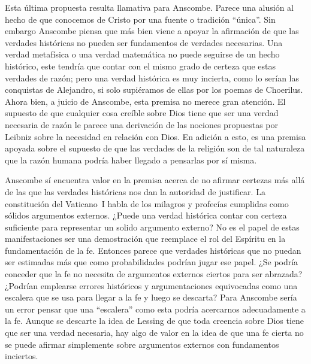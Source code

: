 Esta última propuesta resulta llamativa para Anscombe. Parece una alusión al
hecho de que conocemos de Cristo por una fuente o tradición \enquote{única}. Sin
embargo Anscombe piensa que más bien viene a apoyar la afirmación de que las
verdades históricas no pueden ser fundamentos de verdades necesarias. Una verdad
metafísica o una verdad matemática no puede seguirse de un hecho histórico, este
tendría que contar con el mismo grado de certeza que estas verdades de razón;
pero una verdad histórica es muy incierta, como lo serían las conquistas de
Alejandro, si solo supiéramos de ellas por los poemas de Choerilus. Ahora bien,
a juicio de Anscombe, esta premisa no merece gran atención. El supuesto de que
cualquier cosa creíble sobre Dios tiene que ser una verdad necesaria de razón le
parece una derivación de las nociones propuestas por Leibniz sobre la necesidad
en relación con Dios. En adición a esto, es una premisa apoyada sobre el
supuesto de que las verdades de la religión son de tal naturaleza que la razón
humana podría haber llegado a pensarlas por sí misma.

Anscombe sí encuentra valor en la premisa acerca de no afirmar certezas más allá
de las que las verdades históricas nos dan la autoridad de justificar. La
constitución del Vaticano~I habla de los milagros y profecías cumplidas como
sólidos argumentos externos. ¿Puede una verdad histórica contar con certeza
suficiente para representar un solido argumento externo? No es el papel de estas
manifestaciones ser una demostración que reemplace el rol del Espíritu en la
fundamentación de la fe. Entonces parece que verdades históricas que no puedan
ser estimadas más que como probabilidades podrían jugar ese papel. ¿Se podría
conceder que la fe no necesita de argumentos externos ciertos para ser abrazada?
¿Podrían emplearse errores históricos y argumentaciones equivocadas como una
escalera que se usa para llegar a la fe y luego se descarta? Para Anscombe sería
un error pensar que una \enquote{escalera} como esta podría acercarnos
adecuadamente a la fe. Aunque se descarte la idea de Lessing de que toda
creencia sobre Dios tiene que ser una verdad necesaria, hay algo de valor en la
idea de que una fe cierta no se puede afirmar simplemente sobre argumentos
externos con fundamentos inciertos.

